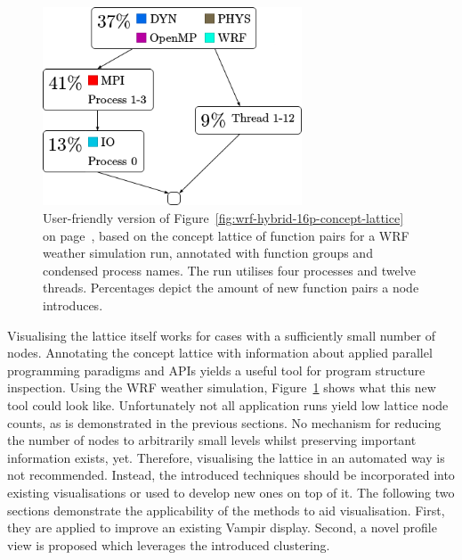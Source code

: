 \documentclass[a4paper, final, diplominf]{zih-template}
\begin{document}
\begin{figure}[b!]
	\centering
	\includegraphics[width=7.7cm]{wrf-hybrid-16p-user-presentable-concept-lattice} %
	\caption{User-friendly version of Figure~\ref{fig:wrf-hybrid-16p-concept-lattice} on page~\pageref{fig:wrf-hybrid-16p-concept-lattice}, based on the concept lattice of function pairs for a WRF weather simulation run, annotated with function groups and condensed process names. The run utilises four processes and twelve threads. Percentages depict the amount of new function pairs a node introduces.}
	\label{fig:wrf-hybrid-16p-user-presentable-concept-lattice}
\end{figure}
Visualising the lattice itself works for cases with a sufficiently small number of nodes.
Annotating the concept lattice with information about applied parallel programming paradigms and APIs yields a useful tool for program structure inspection.
Using the WRF weather simulation, Figure~\ref{fig:wrf-hybrid-16p-user-presentable-concept-lattice} shows what this new tool could look like.
Unfortunately not all application runs yield low lattice node counts, as is demonstrated in the previous sections.
No mechanism for reducing the number of nodes to arbitrarily small levels whilst preserving important information exists, yet.
Therefore, visualising the lattice in an automated way is not recommended.
Instead, the introduced techniques should be incorporated into existing visualisations or used to develop new ones on top of it.
The following two sections demonstrate the applicability of the methods to aid visualisation.
First, they are applied to improve an existing Vampir display.
Second, a novel profile view is proposed which leverages the introduced clustering.

\end{document}
